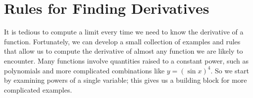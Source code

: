 \chapter{Rules for Finding Derivatives}

It is tedious to compute a limit every time we need to know the
derivative of a function. Fortunately, we can develop a small
collection of examples and rules that allow us to compute the
derivative of almost any function we are likely to encounter. Many
functions involve quantities raised to a constant power, such as
polynomials and more complicated combinations like $y=(\sin x)^4$. So
we start by examining powers of a single variable; this gives us a
building block for more complicated examples.







